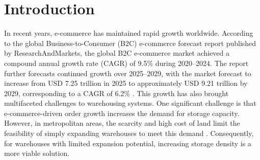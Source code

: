 \chapter{Introduction}

In recent years, e-commerce has maintained rapid growth worldwide. According to the global Business-to-Consumer (B2C) e-commerce forecast report published by ResearchAndMarkets, the global B2C e-commerce market achieved a compound annual growth rate (CAGR) of 9.5\% during 2020--2024. The report further forecasts continued growth over 2025--2029, with the market forecast to increase from USD 7.25 trillion in 2025 to approximately USD 9.21 trillion by 2029, corresponding to a CAGR of 6.2\% \cite{ResearchAndMarkets2025}. This growth has also brought multifaceted challenges to warehousing systems. One significant challenge is that e-commerce-driven order growth increases the demand for storage capacity. However, in metropolitan areas, the scarcity and high cost of land limit the feasibility of simply expanding warehouses to meet this demand \cite{Xiao2021,Sakai2024}. Consequently, for warehouses with limited expansion potential, increasing storage density is a more viable solution.


